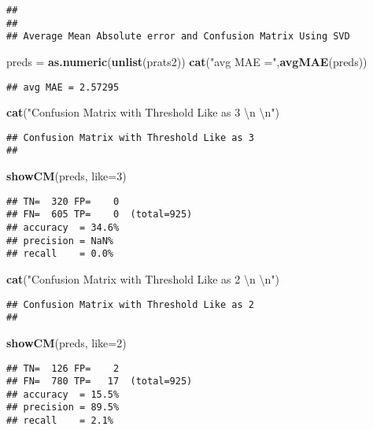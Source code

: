 \documentclass[]{article}
\newenvironment{Shaded}{\begin{snugshade}}{\end{snugshade}}
\newcommand{\CharTok}[1]{\textcolor[rgb]{0.31,0.60,0.02}{#1}}
\newcommand{\DataTypeTok}[1]{\textcolor[rgb]{0.13,0.29,0.53}{#1}}
\newcommand{\DecValTok}[1]{\textcolor[rgb]{0.00,0.00,0.81}{#1}}
\newcommand{\KeywordTok}[1]{\textcolor[rgb]{0.13,0.29,0.53}{\textbf{#1}}}
\newcommand{\NormalTok}[1]{#1}
\newcommand{\StringTok}[1]{\textcolor[rgb]{0.31,0.60,0.02}{#1}}
\begin{document}
\begin{verbatim}
## 
##  
## Average Mean Absolute error and Confusion Matrix Using SVD
\end{verbatim}

\begin{Shaded}
\begin{Highlighting}[]
\NormalTok{preds =}\StringTok{ }\KeywordTok{as.numeric}\NormalTok{(}\KeywordTok{unlist}\NormalTok{(prats2))}
\KeywordTok{cat}\NormalTok{(}\StringTok{"avg MAE ="}\NormalTok{,}\KeywordTok{avgMAE}\NormalTok{(preds))}
\end{Highlighting}
\end{Shaded}

\begin{verbatim}
## avg MAE = 2.57295
\end{verbatim}

\begin{Shaded}
\begin{Highlighting}[]
\KeywordTok{cat}\NormalTok{(}\StringTok{"Confusion Matrix with Threshold Like as 3 }\CharTok{\textbackslash{}n}\StringTok{ }\CharTok{\textbackslash{}n}\StringTok{"}\NormalTok{)}
\end{Highlighting}
\end{Shaded}

\begin{verbatim}
## Confusion Matrix with Threshold Like as 3 
## 
\end{verbatim}

\begin{Shaded}
\begin{Highlighting}[]
\KeywordTok{showCM}\NormalTok{(preds, }\DataTypeTok{like=}\DecValTok{3}\NormalTok{)}
\end{Highlighting}
\end{Shaded}

\begin{verbatim}
## TN=  320 FP=    0
## FN=  605 TP=    0  (total=925)
## accuracy  = 34.6%
## precision = NaN%
## recall    = 0.0%
\end{verbatim}

\begin{Shaded}
\begin{Highlighting}[]
\KeywordTok{cat}\NormalTok{(}\StringTok{"Confusion Matrix with Threshold Like as 2 }\CharTok{\textbackslash{}n}\StringTok{ }\CharTok{\textbackslash{}n}\StringTok{"}\NormalTok{)}
\end{Highlighting}
\end{Shaded}

\begin{verbatim}
## Confusion Matrix with Threshold Like as 2 
## 
\end{verbatim}

\begin{Shaded}
\begin{Highlighting}[]
\KeywordTok{showCM}\NormalTok{(preds, }\DataTypeTok{like=}\DecValTok{2}\NormalTok{)}
\end{Highlighting}
\end{Shaded}

\begin{verbatim}
## TN=  126 FP=    2
## FN=  780 TP=   17  (total=925)
## accuracy  = 15.5%
## precision = 89.5%
## recall    = 2.1%
\end{verbatim}
\end{document}
